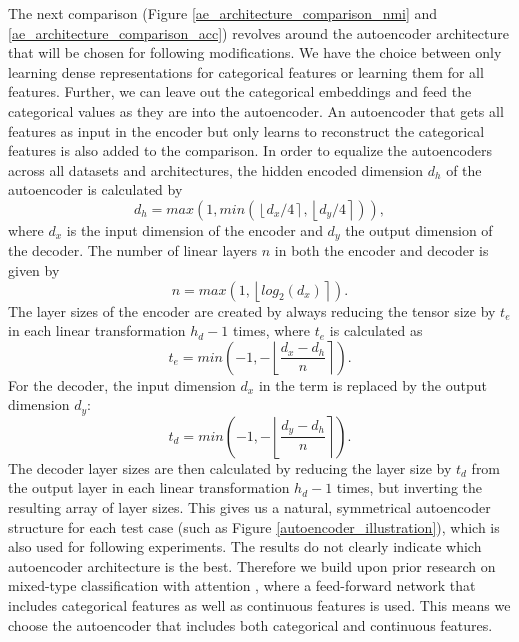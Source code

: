 The next comparison (Figure \ref{ae_architecture_comparison_nmi} and \ref{ae_architecture_comparison_acc}) revolves around the autoencoder architecture that will be chosen for following modifications. We have the choice between only learning dense representations for categorical features or learning them for all features. Further, we can leave out the categorical embeddings and feed the categorical values as they are into the autoencoder. An autoencoder that gets all features as input in the encoder but only learns to reconstruct the categorical features is also added to the comparison. In order to equalize the autoencoders across all datasets and architectures, the hidden encoded dimension $d_h$ of the autoencoder is calculated by
$$d_h = max(1, min(\left\lfloor d_x/4\right\rceil, \left\lfloor d_y/4\right\rceil)),$$
where $d_x$ is the input dimension of the encoder and $d_y$ the output dimension of the decoder. The number of linear layers $n$ in both the encoder and decoder is given by
$$n = max(1, \left\lfloor log_2 (d_x)\right\rceil).$$
The layer sizes of the encoder are created by always reducing the tensor size by $t_e$ in each linear transformation $h_d - 1$ times, where $t_e$ is calculated as
$$t_e = min(-1, -\left\lfloor \frac{d_x - d_h}{n} \right\rceil).$$
For the decoder, the input dimension $d_x$ in the term is replaced by the output dimension $d_y$:
$$t_d = min(-1, -\left\lfloor \frac{d_y - d_h}{n} \right\rceil).$$
The decoder layer sizes are then calculated by reducing the layer size by $t_d$ from the output layer in each linear transformation $h_d - 1$ times, but inverting the resulting array of layer sizes. This gives us a natural, symmetrical autoencoder structure for each test case (such as Figure \ref{autoencoder_illustration}), which is also used for following experiments. The results do not clearly indicate which autoencoder architecture is the best. Therefore we build upon prior research on mixed-type classification with attention \cite{tab_transformer, ft_transformer}, where a feed-forward network that includes categorical features as well as continuous features is used. This means we choose the autoencoder that includes both categorical and continuous features.

